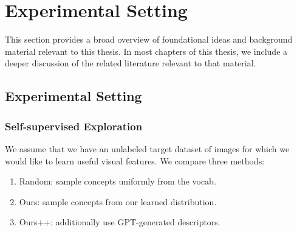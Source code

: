 \chapter{Experimental Setting}
This section provides a broad overview of foundational ideas
and background material relevant to this thesis.
In most chapters of this thesis, we include a deeper
discussion of the related literature relevant to
that material.


\section{Experimental Setting}
\subsection{Self-supervised Exploration}
We assume that we have an unlabeled target dataset of images for which we would like to learn useful visual features. We compare three methods:
\begin{enumerate}[noitemsep,topsep=0pt]
    \item Random: sample concepts uniformly from the vocab. 
    \item Ours: sample concepts from our learned distribution. 
    \item Ours++: additionally use GPT-generated descriptors.
\end{enumerate}

